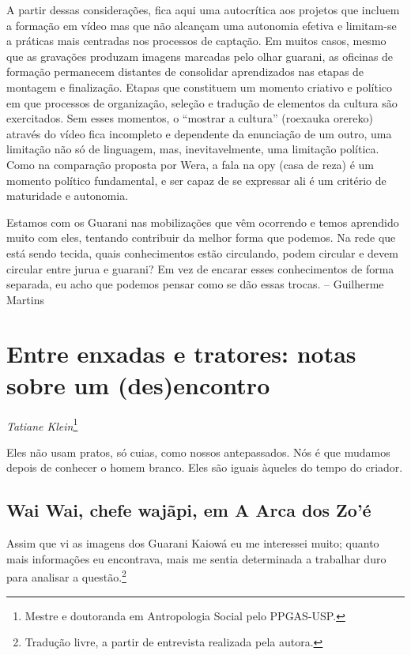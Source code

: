 A partir dessas considerações, fica aqui uma autocrítica aos projetos
que incluem a formação em vídeo mas que não alcançam uma autonomia
efetiva e limitam-se a práticas mais centradas nos processos de
captação. Em muitos casos, mesmo que as gravações produzam imagens
marcadas pelo olhar guarani, as oficinas de formação permanecem
distantes de consolidar aprendizados nas etapas de montagem e
finalização. Etapas que constituem um momento criativo e político em
que processos de organização, seleção e tradução de elementos da
cultura são exercitados. Sem esses momentos, o ``mostrar a cultura''
(roexauka orereko) através do vídeo fica incompleto e dependente da
enunciação de um outro, uma limitação não só de linguagem, mas,
inevitavelmente, uma limitação política. Como na comparação proposta
por Wera, a fala na opy (casa de reza) é um momento político
fundamental, e ser capaz de se expressar ali é um critério de
maturidade e autonomia.

Estamos com os Guarani nas mobilizações que vêm ocorrendo e temos
aprendido muito com eles, tentando contribuir da melhor forma que
podemos. Na rede que está sendo tecida, quais conhecimentos estão
circulando, podem circular e devem circular entre jurua e guarani? Em
vez de encarar esses conhecimentos de forma separada, eu acho que
podemos pensar como se dão essas trocas. – Guilherme Martins

\chapter{Entre enxadas e tratores: notas sobre um (des)encontro}
\begin{flushright}
\emph{Tatiane Klein}\footnote{Mestre e doutoranda em Antropologia Social pelo
PPGAS-USP.}
\end{flushright}
\medskip

Eles não usam pratos, só cuias, como nossos antepassados. Nós é que
mudamos depois de conhecer o homem branco. Eles são iguais àqueles do
tempo do criador.

\section{Wai Wai, chefe wajãpi, em A Arca dos Zo’é}

Assim que vi as imagens dos Guarani Kaiowá eu me interessei muito;
quanto mais informações eu encontrava, mais me sentia determinada a
trabalhar duro para analisar a questão.\footnote{Tradução livre, a
partir de entrevista realizada pela autora.}

